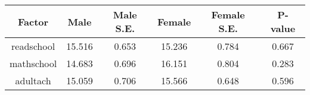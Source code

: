 \begin{longtable}{c c c c c c}
\toprule
\textbf{Factor} & \textbf{Male} & \textbf{Male S.E.}  & \textbf{Female} & \textbf{Female S.E.} & \textbf{P-value} \\
\midrule
readschool & 15.516 & 0.653 &  15.236 & 0.784 & 0.667 \\
mathschool & 14.683 & 0.696 &  16.151 & 0.804 & 0.283 \\
adultach & 15.059 & 0.706 &  15.566 & 0.648 & 0.596 \\
\bottomrule
\end{longtable}
